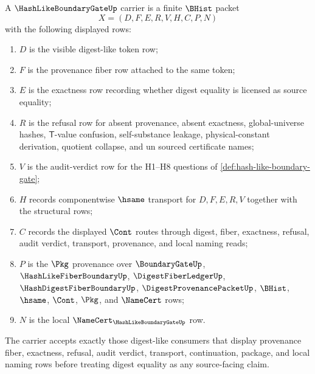 \begin{definition}
\label{def:hash-like-boundary-gate-carrier}
A $\HashLikeBoundaryGateUp$ carrier is a finite $\BHist$ packet
$$
X=(D,F,E,R,V,H,C,P,N)
$$
with the following displayed rows:
\begin{enumerate}
\item $D$ is the visible digest-like token row;
\item $F$ is the provenance fiber row attached to the same token;
\item $E$ is the exactness row recording whether digest equality is licensed as source equality;
\item $R$ is the refusal row for absent provenance, absent exactness, global-universe hashes, $\mathsf{T}$-value confusion, self-substance leakage, physical-constant derivation, quotient collapse, and un sourced certificate names;
\item $V$ is the audit-verdict row for the H1--H8 questions of \autoref{def:hash-like-boundary-gate};
\item $H$ records componentwise $\hsame$ transport for $D,F,E,R,V$ together with the structural rows;
\item $C$ records the displayed $\Cont$ routes through digest, fiber, exactness, refusal, audit verdict, transport, provenance, and local naming reads;
\item $P$ is the $\Pkg$ provenance over $\BoundaryGateUp$, $\HashLikeFiberBoundaryUp$, $\DigestFiberLedgerUp$, $\HashDigestFiberBoundaryUp$, $\DigestProvenancePacketUp$, $\BHist$, $\hsame$, $\Cont$, $\Pkg$, and $\NameCert$ rows;
\item $N$ is the local $\NameCert_{\HashLikeBoundaryGateUp}$ row.
\end{enumerate}
The carrier accepts exactly those digest-like consumers that display provenance fiber, exactness, refusal, audit verdict, transport, continuation, package, and local naming rows before treating digest equality as any source-facing claim.
\end{definition}

